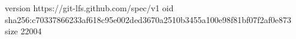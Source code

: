 version https://git-lfs.github.com/spec/v1
oid sha256:c70337866233af618c95e002ded3670a2510b3455a100e98f81bf07f2af0e873
size 22004
